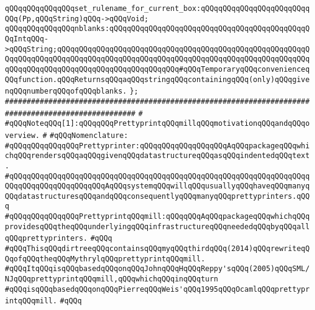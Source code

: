 \newline
\verb|qQQqqQQqqQQqqQQqset_rulename_for_current_box:qQQqqQQqqQQqqQQqqQQqqQQqqQQq(Pp,qQQqString)qQQq->qQQqVoid;|\newline
\newline
\verb|qQQqqQQqqQQqqQQqnblanks:qQQqqQQqqQQqqQQqqQQqqQQqqQQqqQQqqQQqqQQqqQQqqQQqIntqQQq->qQQqString;qQQqqQQqqQQqqQQqqQQqqQQqqQQqqQQqqQQqqQQqqQQqqQQqqQQqqQQqqQQqqQQqqQQqqQQqqQQqqQQqqQQqqQQqqQQqqQQqqQQqqQQqqQQqqQQqqQQqqQQqqQQqqQQqqQQqqQQqqQQqqQQqqQQqqQQqqQQqqQQqqQQqqQQq#qQQqTemporaryqQQqconvenienceqQQqfunction.qQQqReturnsqQQqaqQQqstringqQQqcontainingqQQq(only)qQQqgivenqQQqnumberqQQqofqQQqblanks.|\newline
\verb|};|\newline
\newline
\newline
\verb|####################################################################################################|\newline
\verb|#|\newline
\verb|#qQQqNoteqQQq[1]:qQQqqQQqPrettyprintqQQqmillqQQqmotivationqQQqandqQQqoverview.|\newline
\verb|#|\newline
\verb|#qQQqNomenclature:|\newline
\verb|#qQQqqQQqqQQqqQQqPrettyprinter:qQQqqQQqqQQqqQQqqQQqAqQQqpackageqQQqwhichqQQqrendersqQQqaqQQqgivenqQQqdatastructureqQQqasqQQqindentedqQQqtext.|\newline
\verb|#qQQqqQQqqQQqqQQqqQQqqQQqqQQqqQQqqQQqqQQqqQQqqQQqqQQqqQQqqQQqqQQqqQQqqQQqqQQqqQQqqQQqqQQqqQQqAqQQqsystemqQQqwillqQQqusuallyqQQqhaveqQQqmanyqQQqdatastructuresqQQqandqQQqconsequentlyqQQqmanyqQQqprettyprinters.qQQq|\newline
\verb|#qQQqqQQqqQQqqQQqPrettyprintqQQqmill:qQQqqQQqAqQQqpackageqQQqwhichqQQqprovidesqQQqtheqQQqunderlyingqQQqinfrastructureqQQqneededqQQqbyqQQqallqQQqprettyprinters.|\newline
\verb|#qQQq|\newline
\verb|#qQQqThisqQQqdirtreeqQQqcontainsqQQqmyqQQqthirdqQQq(2014)qQQqrewriteqQQqofqQQqtheqQQqMythrylqQQqprettyprintqQQqmill.|\newline
\verb|#qQQqItqQQqisqQQqbasedqQQqonqQQqJohnqQQqHqQQqReppy'sqQQq(2005)qQQqSML/NJqQQqprettyprintqQQqmill,qQQqwhichqQQqinqQQqturn|\newline
\verb|#qQQqisqQQqbasedqQQqonqQQqPierreqQQqWeis'qQQq1995qQQqOcamlqQQqprettyprintqQQqmill.|\newline
\verb|#qQQq|\newline
